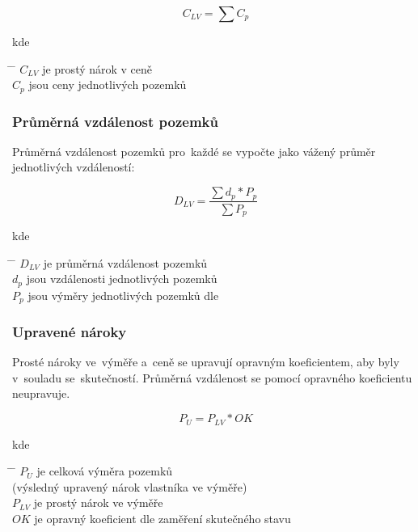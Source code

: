 \begin{equation} C_{LV} = \sum\nolimits C_{p}
\end{equation}

kde
\begin{tabbing} \hspace{2em} \= \hspace{5em} \= \kill \> $C_{LV}$ \>
je prostý nárok v ceně \\ \> $C_{p}$ \> jsou ceny jednotlivých pozemků
\end{tabbing}

\subsubsection{Průměrná vzdálenost pozemků}
\label{prumerna_vzdalenost_pozemku}

Průměrná vzdálenost pozemků pro~každé  se vypočte jako vážený
průměr jednotlivých vzdáleností:

\begin{equation} D_{LV} = \frac{\sum\nolimits
d_{p}*P_{p}}{\sum\nolimits P_{p}}
\end{equation}

kde
\begin{tabbing} \hspace{2em} \= \hspace{5em} \= \kill \> $D_{LV}$ \>
je průměrná vzdálenost pozemků \\ \> $d_{p}$ \> jsou vzdálenosti
jednotlivých pozemků \\ \> $P_{p}$ \> jsou výměry jednotlivých pozemků
dle 
\end{tabbing}

\subsubsection{Upravené nároky}
\label{upravene_naroky}

Prosté nároky ve~výměře a~ceně se upravují opravným koeficientem, aby
byly v~soula\-du se~skutečností. Průměrná vzdálenost se pomocí
opravného koeficientu neupravuje.

\begin{equation} P_{U} = P_{LV}*OK
\end{equation}

kde
\begin{tabbing} \hspace{2em} \= \hspace{5em} \= \kill \> $P_{U}$ \> je
celková výměra pozemků \\ \> \>(výsledný upravený nárok vlastníka ve výměře)
\\ \> $P_{LV}$ \> je prostý nárok ve výměře \\ \> $OK$ \> je opravný koeficient
dle zaměření skutečného stavu
\end{tabbing}

